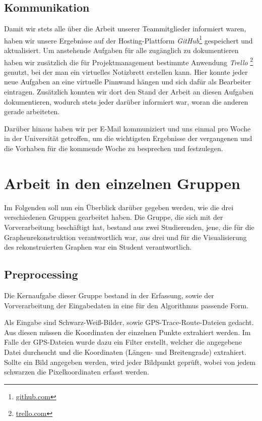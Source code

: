 \documentclass[parskip=half,
 fontsize=12pt, bibtotoc,
 ngerman]
 {article}
\begin{document}
\subsection{Kommunikation}
Damit wir stets alle über die Arbeit unserer Teammitglieder informiert waren, haben wir unsere Ergebnisse auf der Hosting-Plattform \textit{GitHub}\footnote{\url{github.com}} gespeichert und aktualisiert. Um anstehende Aufgaben für alle zugänglich zu dokumentieren haben wir zusätzlich die für Projektmanagement bestimmte Anwendung \textit{Trello} \footnote{\url{trello.com}} genutzt, bei der man ein virtuelles Notizbrett erstellen kann. Hier konnte jeder neue Aufgaben an eine virtuelle Pinnwand hängen und sich dafür als Bearbeiter eintragen. Zusätzlich konnten wir dort den Stand der Arbeit an diesen Aufgaben dokumentieren, wodurch stets jeder darüber informiert war, woran die anderen gerade arbeiteten.

Darüber hinaus haben wir per E-Mail kommuniziert und uns einmal pro Woche in der Universität getroffen, um die wichtigsten Ergebnisse der vergangenen und die Vorhaben für die kommende Woche zu besprechen und festzulegen.
 
\section{Arbeit in den einzelnen Gruppen}
Im Folgenden soll nun ein Überblick darüber gegeben werden, wie die drei verschiedenen Gruppen gearbeitet haben. Die Gruppe, die sich mit der Vorverarbeitung beschäftigt hat, bestand aus zwei Studierenden, jene, die für die Graphenrekonstruktion verantwortlich war, aus drei und für die Visualisierung des rekonstruierten Graphen war ein Student verantwortlich.

\subsection{Preprocessing}
Die Kernaufgabe dieser Gruppe bestand in der Erfassung, sowie der Vorverarbeitung der Eingabedaten in eine für den Algorithmus passende Form.

Als Eingabe sind Schwarz-Weiß-Bilder, sowie GPS-Trace-Route-Dateien gedacht. Aus diesen müssen die Koordinaten der einzelnen Punkte extrahiert werden. Im Falle der GPS-Dateien wurde dazu ein Filter erstellt, welcher die angegebene Datei durchsucht und die Koordinaten (Längen- und Breitengrade) extrahiert. Sollte ein Bild angegeben werden, wird jeder Bildpunkt geprüft, wobei von jedem schwarzen die Pixelkoordinaten erfasst werden.
\end{document}

